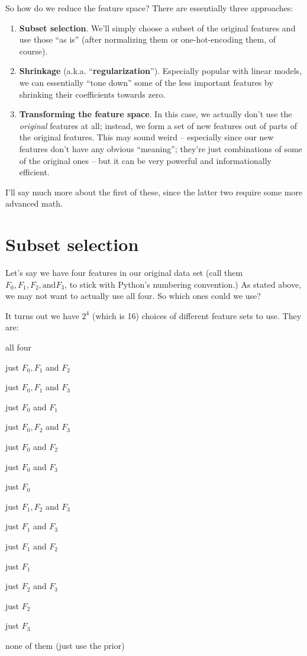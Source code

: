 So how do we reduce the feature space? There are essentially three approaches:

\begin{enumerate}
\itemsep.1em
\item \textbf{Subset selection}. We'll simply choose a subset of the original
features and use those ``as is'' (after normalizing them or one-hot-encoding
them, of course).
\item \textbf{Shrinkage} (a.k.a. ``\textbf{regularization}''). Especially
popular with linear models, we can essentially ``tone down'' some of the less
important features by shrinking their coefficients towards zero.
\item \textbf{Transforming the feature space}. In this case, we actually don't
use the \textit{original} features at all; instead, we form a set of
new features out of parts of the original features. This may sound weird --
especially since our new features don't have any obvious ``meaning''; they're
just combinations of some of the original ones -- but it can be very powerful
and informationally efficient.
\end{enumerate}

I'll say much more about the first of these, since the latter two require some
more advanced math.

\section{Subset selection}

Let's say we have four features in our original data set (call them
$F_0,F_1,F_2, \textrm{and} F_3$, to stick with Python's numbering
convention.) As stated above, we may not want to actually use all four. So
which ones could we use?

It turns out we have $2^4$ (which is 16) choices of different feature sets to
use. They are:

\begin{compactitem}
\item all four
\item just $F_0,F_1$ and $F_2$
\item just $F_0,F_1$ and $F_3$
\item just $F_0$ and $F_1$
\item just $F_0,F_2$ and $F_3$
\item just $F_0$ and $F_2$
\item just $F_0$ and $F_3$
\item just $F_0$
\item just $F_1,F_2$ and $F_3$
\item just $F_1$ and $F_3$
\item just $F_1$ and $F_2$
\item just $F_1$
\item just $F_2$ and $F_3$
\item just $F_2$
\item just $F_3$
\item none of them (just use the prior)
\end{compactitem}

